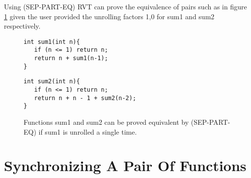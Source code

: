 Using (SEP-PART-EQ) RVT can prove the equivalence of pairs such as in figure \ref{fig:sum} given the user provided the unrolling factors 1,0 for sum1 and sum2 respectively. 

\begin{figure}[h]
\begin{center}
\begin{minipage}{7 cm}
\begin{lstlisting}
int sum1(int n){
   if (n <= 1) return n;
   return n + sum1(n-1);
}
\end{lstlisting}
\end{minipage}
\begin{minipage}{7 cm}
\begin{lstlisting}
int sum2(int n){
   if (n <= 1) return n;
   return n + n - 1 + sum2(n-2);
}
\end{lstlisting}
\end{minipage}
\caption{Functions sum1 and sum2 can be proved equivalent by (SEP-PART-EQ) if sum1 is unrolled a single time.}
\label{fig:sum}
\end{center}
\end{figure}
\section{Synchronizing A Pair Of Functions}

